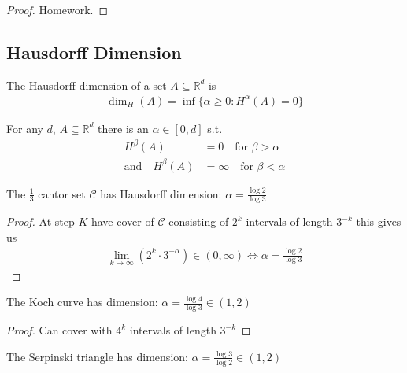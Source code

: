 \begin{proof}
	Homework.
\end{proof}

\subsection{Hausdorff Dimension}

\begin{definition}
	The Hausdorff dimension of a set $A \subseteq \mathbb{R}^d$ is
	\begin{align*}
		\dim_{H} (A) = \inf\{\alpha \geq 0 : H^{\alpha} (A) = 0 \}
	\end{align*}
\end{definition}

\begin{lemma}
	For any $d$, $A \subseteq \mathbb{R}^d$ there is an $\alpha \in [0,d]$ s.t.
	\begin{align*}
		H^{\beta} (A) &= 0 \quad \text{for } \beta > \alpha \\
		\text{and} \quad H^{\beta} (A) &= \infty \quad \text{for } \beta < \alpha
	\end{align*}
\end{lemma}


\begin{example}
	The $\frac{1}{3}$ cantor set $\mathcal{C}$ has Hausdorff dimension: $\alpha = \frac{\log 2}{\log 3}$
	\begin{proof}
		At step $K$ have cover of $\mathcal{C}$ consisting of $2^{k}$ intervals of length $3^{-k}$ this gives us
		\begin{align*}
		\lim_{k \to \infty} (2^{k}\cdot 3^{-\alpha}) \in (0, \infty) \iff \alpha = \frac{\log 2}{\log 3}
		\end{align*}
	\end{proof}

\end{example}

\begin{example}
	The Koch curve has dimension: $\alpha = \frac{\log 4}{\log 3} \in (1,2)$
	\begin{proof}
		Can cover with $4^{k}$ intervals of length $3^{-k}$
	\end{proof}

\end{example}

\begin{example}
	The Serpinski triangle has dimension: $\alpha = \frac{\log 3}{\log 2} \in (1,2)$
\end{example}

